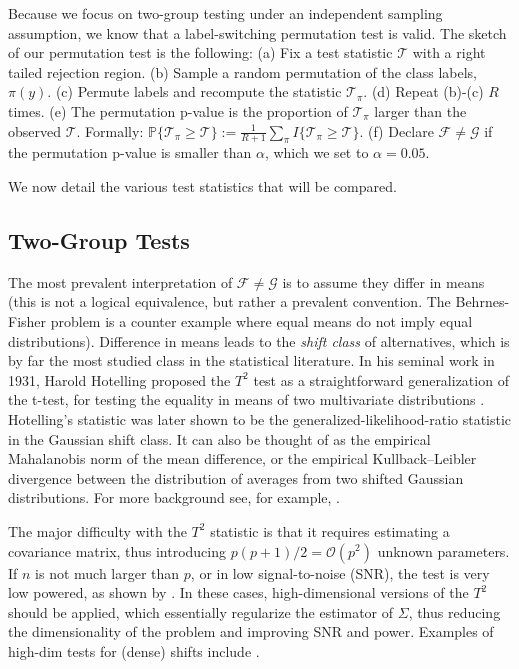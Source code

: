 \documentclass[]{bio}
\begin{document}
Because we focus on two-group testing under an independent sampling assumption, we know that a label-switching permutation test is valid. 
The sketch of our permutation test is the following: \newline
(a) Fix a test statistic $\mathcal{T}$ with a right tailed rejection region. \newline
(b) Sample a random permutation of the class labels, $\pi(y)$. \newline
(c) Permute labels and recompute the statistic $\mathcal{T}_\pi$. \newline
(d) Repeat (b)-(c) $R$ times. \newline
(e) The permutation p-value is the proportion of  $\mathcal{T}_\pi$ larger than the observed $\mathcal{T}$. Formally: 
$\mathbb{P}\{\mathcal{T}_\pi \geq \mathcal{T}\}:=\frac{1}{R+1} \sum_{\pi} I\{\mathcal{T}_\pi \geq \mathcal{T}\}$.\newline
(f) Declare $\mathcal{F}\neq \mathcal{G}$ if the permutation p-value is smaller than $\alpha$, which we set to $\alpha=0.05$.
\bigskip

We now detail the various test statistics that will be compared.


\subsection{Two-Group Tests}
The most prevalent interpretation of $\mathcal{F}\neq \mathcal{G}$ is to assume they differ in means (this is not a logical equivalence, but rather a prevalent convention. The Behrnes-Fisher problem is a counter example where equal means do not imply equal distributions). 
Difference in means leads to the \emph{shift class} of alternatives, which is by far the most studied class in the statistical literature. 
In his seminal work in 1931, Harold Hotelling proposed the $T^2$ test as a straightforward generalization of the t-test, for testing the equality in means of two multivariate distributions \cite{hotelling_generalization_1931}. 
Hotelling's statistic was later shown to be the generalized-likelihood-ratio statistic in the Gaussian shift class. 
It can also be thought of as the empirical Mahalanobis norm of the mean difference, or the empirical Kullback–Leibler divergence between the distribution of averages from two shifted Gaussian distributions. 
For more background see, for example, \cite{anderson_introduction_2003}.

The major difficulty with the $T^2$ statistic is that it requires estimating a covariance matrix, thus introducing $p(p+1)/2=\mathcal{O}(p^2)$ unknown parameters.
If $n$ is not much larger than $p$, or in low signal-to-noise (SNR), the test is very low powered, as shown by \cite{bai1996effect}. 
In these cases, high-dimensional versions of the $T^2$ should be applied, which essentially regularize the estimator of $\Sigma$, thus reducing the dimensionality of the problem and improving SNR and power.
Examples of high-dim tests for (dense) shifts include 
\cite{dempster1958high,bai1996effect,schafer_shrinkage_2005,goeman2006testing,srivastava_test_2008,chen_two-sample_2010,lopes2011more,ahmad2014u,thulin2014high,feng2015note}.
\end{document}
